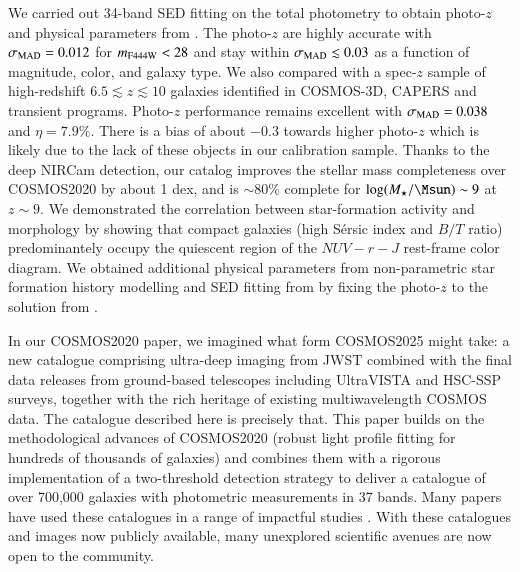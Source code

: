 \documentclass[longauth]{aa}
\begin{document}
We carried out 34-band SED fitting on the total photometry to obtain photo-$z$ and physical parameters from \lephare{}. The photo-$z$ are highly accurate with $\sigma_{\rm MAD} = 0.012$ for $m_{\rm F444W} < 28$ and stay within $\sigma_{\rm MAD} \lesssim 0.03$ as a function of magnitude, color, and galaxy type. We also compared with a spec-$z$ sample of high-redshift $6.5\lesssim z \lesssim 10$ galaxies identified in COSMOS-3D, CAPERS and transient programs. Photo-$z$ performance remains excellent with $\sigma_{\rm MAD} = 0.038$ and $\eta = 7.9 \%$. There is a bias of about $-0.3$ towards higher photo-$z$ which is likely due to the lack of these objects in our calibration sample. Thanks to the deep NIRCam detection, our catalog improves the stellar mass completeness over COSMOS2020 by about 1 dex, and is $\sim 80 \%$ complete for ${\rm log} (M_{\star}/\si{\Msun}) \sim 9$ at $z\sim9$. We demonstrated the correlation between star-formation activity and morphology by showing that compact galaxies (high Sérsic index and $B/T$ ratio) predominantely occupy the quiescent region of the $NUV-r-J$ rest-frame color diagram. We obtained additional physical parameters from non-parametric star formation history modelling and SED fitting from \cigale{} by fixing the photo-$z$ to the solution from \lephare{}. 

In our COSMOS2020 paper, we imagined what form COSMOS2025 might take: a new catalogue comprising ultra-deep imaging from JWST combined with the final data releases from ground-based telescopes including UltraVISTA and HSC-SSP surveys, together with the rich heritage of existing multiwavelength COSMOS data. The catalogue described here is precisely that. This paper builds on the methodological advances of COSMOS2020 (robust light profile fitting for hundreds of thousands of galaxies) and combines them with a rigorous implementation of a two-threshold detection strategy to deliver a catalogue of over 700,000
galaxies with photometric measurements in 37 bands.  Many papers have used these catalogues in a range of impactful studies \citep[e.g.,][]{Casey2024, Franco2024, Akins2024, Gentile2024, Shuntov2024, Arango-Toro2024, Paquereau2025, MHC2025, Kaminsky2025, Toni2025, Yang2025, Nightingale2025}. With these catalogues and images now publicly available, many unexplored scientific avenues are now open to the community. 
\end{document}
